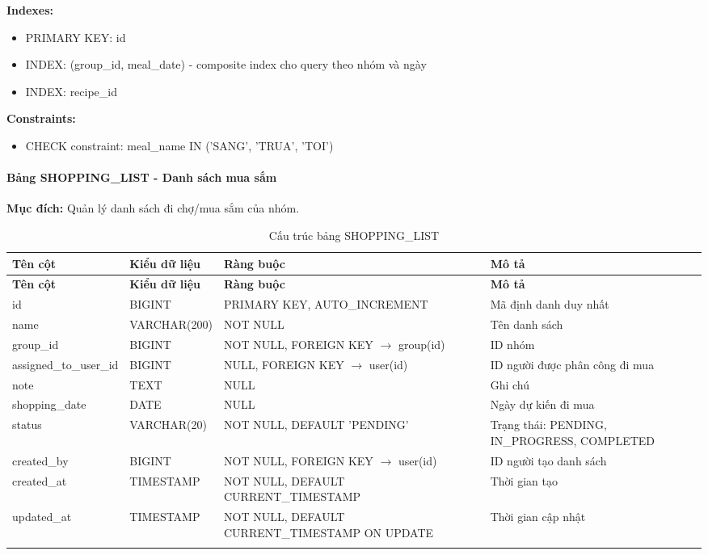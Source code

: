 \textbf{Indexes:}
\begin{itemize}
    \item PRIMARY KEY: id
    \item INDEX: (group\_id, meal\_date) - composite index cho query theo nhóm và ngày
    \item INDEX: recipe\_id
\end{itemize}

\textbf{Constraints:}
\begin{itemize}
    \item CHECK constraint: meal\_name IN ('SANG', 'TRUA', 'TOI')
\end{itemize}

\paragraph{Bảng SHOPPING\_LIST - Danh sách mua sắm}
\textbf{Mục đích:} Quản lý danh sách đi chợ/mua sắm của nhóm.

\small
\begin{longtable}{|>{\raggedright\arraybackslash}p{3.8cm}|>{\raggedright\arraybackslash}p{3cm}|>{\raggedright\arraybackslash}p{3.8cm}|>{\raggedright\arraybackslash}p{3.9cm}|}
\hline
\textbf{Tên cột} & \textbf{Kiểu dữ liệu} & \textbf{Ràng buộc} & \textbf{Mô tả} \\
\hline
\endfirsthead
\hline
\textbf{Tên cột} & \textbf{Kiểu dữ liệu} & \textbf{Ràng buộc} & \textbf{Mô tả} \\
\hline
\endhead
id & BIGINT & PRIMARY KEY, AUTO\_INCREMENT & Mã định danh duy nhất \\
\hline
name & VARCHAR(200) & NOT NULL & Tên danh sách \\
\hline
group\_id & BIGINT & NOT NULL, FOREIGN KEY $\rightarrow$ group(id) & ID nhóm \\
\hline
assigned\_to\_user\_id & BIGINT & NULL, FOREIGN KEY $\rightarrow$ user(id) & ID người được phân công đi mua \\
\hline
note & TEXT & NULL & Ghi chú \\
\hline
shopping\_date & DATE & NULL & Ngày dự kiến đi mua \\
\hline
status & VARCHAR(20) & NOT NULL, DEFAULT 'PENDING' & Trạng thái: PENDING, IN\_PROGRESS, COMPLETED \\
\hline
created\_by & BIGINT & NOT NULL, FOREIGN KEY $\rightarrow$ user(id) & ID người tạo danh sách \\
\hline
created\_at & TIMESTAMP & NOT NULL, DEFAULT CURRENT\_TIMESTAMP & Thời gian tạo \\
\hline
updated\_at & TIMESTAMP & NOT NULL, DEFAULT CURRENT\_TIMESTAMP ON UPDATE & Thời gian cập nhật \\
\hline
\caption{Cấu trúc bảng SHOPPING\_LIST}
\end{longtable}

